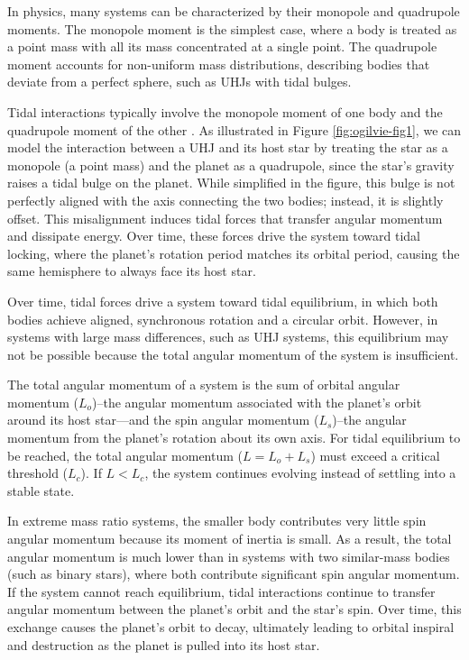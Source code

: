 \documentclass[oneside,12pt]{amsart}
\numberwithin{page}{section}
\begin{document}
In physics, many systems can be characterized by their monopole and quadrupole moments. The monopole moment is the simplest case, where a body is treated as a point mass with all its mass concentrated at a single point. The quadrupole moment accounts for non-uniform mass distributions, describing bodies that deviate from a perfect sphere, such as UHJs with tidal bulges.

Tidal interactions typically involve the monopole moment of one body and the quadrupole moment of the other \citep{ogilvie2014tidal}. As illustrated in Figure \ref{fig:ogilvie-fig1}, we can model the interaction between a UHJ and its host star by treating the star as a monopole (a point mass) and the planet as a quadrupole, since the star’s gravity raises a tidal bulge on the planet. While simplified in the figure, this bulge is not perfectly aligned with the axis connecting the two bodies; instead, it is slightly offset. This misalignment induces tidal forces that transfer angular momentum and dissipate energy. Over time, these forces drive the system toward tidal locking, where the planet’s rotation period matches its orbital period, causing the same hemisphere to always face its host star.

Over time, tidal forces drive a system toward tidal equilibrium, in which both bodies achieve aligned, synchronous rotation and a circular orbit. However, in systems with large mass differences, such as UHJ systems, this equilibrium may not be possible because the total angular momentum of the system is insufficient.

The total angular momentum of a system is the sum of orbital angular momentum ($L_o$)–the angular momentum associated with the planet's orbit around its host star—and the spin angular momentum ($L_s$)–the angular momentum from the planet’s rotation about its own axis.
For tidal equilibrium to be reached, the total angular momentum ($L = L_o + L_s$) must exceed a critical threshold ($L_c$). If $L < L_c$, the system continues evolving instead of settling into a stable state.

In extreme mass ratio systems, the smaller body contributes very little spin angular momentum because its moment of inertia is small. As a result, the total angular momentum is much lower than in systems with two similar-mass bodies (such as binary stars), where both contribute significant spin angular momentum. If the system cannot reach equilibrium, tidal interactions continue to transfer angular momentum between the planet’s orbit and the star’s spin. Over time, this exchange causes the planet’s orbit to decay, ultimately leading to orbital inspiral and destruction as the planet is pulled into its host star.
\end{document}
